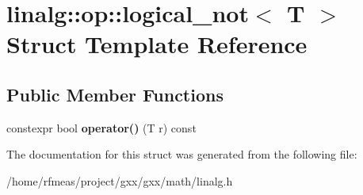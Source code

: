 \hypertarget{structlinalg_1_1op_1_1logical__not}{}\section{linalg\+:\+:op\+:\+:logical\+\_\+not$<$ T $>$ Struct Template Reference}
\label{structlinalg_1_1op_1_1logical__not}
\subsection*{Public Member Functions}
\begin{DoxyCompactItemize}
\item 
constexpr bool {\bfseries operator()} (T r) const \hypertarget{structlinalg_1_1op_1_1logical__not_a62f6b88ac2ee5c49d8a30b04ce9fa622}{}\label{structlinalg_1_1op_1_1logical__not_a62f6b88ac2ee5c49d8a30b04ce9fa622}

\end{DoxyCompactItemize}


The documentation for this struct was generated from the following file\+:\begin{DoxyCompactItemize}
\item 
/home/rfmeas/project/gxx/gxx/math/linalg.\+h\end{DoxyCompactItemize}
